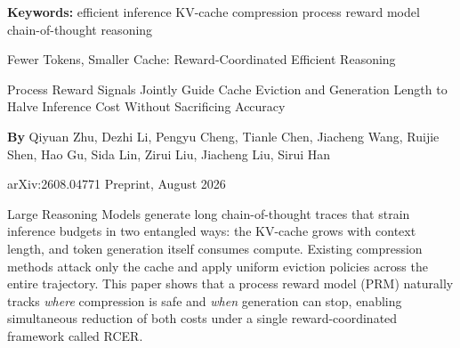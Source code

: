 \documentclass[10pt,twocolumn]{article}
\begin{document}
\setlength{\parindent}{0pt}
\setlength{\parskip}{4pt}

{\small\color{keywordgray}\textbf{Keywords:}
  efficient inference \textbullet{}
  KV-cache compression \textbullet{}
  process reward model \textbullet{}
  chain-of-thought reasoning}\par\vspace{4pt}

{\LARGE\bfseries\raggedright
  Fewer Tokens, Smaller Cache:
  Reward-Coordinated Efficient Reasoning}\par\vspace{4pt}

{\large\itshape\raggedright
  Process Reward Signals Jointly Guide Cache Eviction and Generation
  Length to Halve Inference Cost Without Sacrificing Accuracy}\par\vspace{6pt}

{\small\textbf{By} Qiyuan Zhu, Dezhi Li, Pengyu Cheng, Tianle Chen,
  Jiacheng Wang, Ruijie Shen, Hao Gu, Sida Lin, Zirui Liu, Jiacheng Liu,
  Sirui Han}\par\vspace{2pt}

{\small\color{keywordgray}arXiv:2608.04771 \textbullet{} Preprint, August 2026}
\par\vspace{2pt}\noindent{\color{rulered}\rule{\columnwidth}{0.6pt}}\vspace{6pt}

Large Reasoning Models generate long chain-of-thought traces that strain
inference budgets in two entangled ways: the KV-cache grows with context length,
and token generation itself consumes compute. Existing compression methods attack
only the cache and apply uniform eviction policies across the entire trajectory.
This paper shows that a process reward model (PRM) naturally tracks
\emph{where} compression is safe and \emph{when} generation can stop,
enabling simultaneous reduction of both costs under a single reward-coordinated
framework called RCER.
\end{document}
